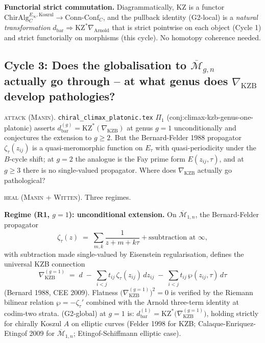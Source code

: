 \documentclass[12pt]{article}
\providecommand{\KZ}{\mathrm{KZ}}
\providecommand{\KZB}{\mathrm{KZB}}
\providecommand{\Arn}{\mathrm{Arnold}}
\providecommand{\Mbar}{\overline{\mathcal{M}}}
\providecommand{\dbar}{d_{\mathrm{bar}}}
\providecommand{\ChirAlg}{\mathrm{ChirAlg}}
\providecommand{\ConnConf}{\mathrm{Conn\text{-}Conf}}
\theoremstyle{definition}
\begin{document}
\textbf{Functorial strict commutation.}
Diagrammatically, $\KZ$ is a functor
$\ChirAlg^{E_\infty,\mathrm{Koszul}}_{C}
 \to \ConnConf_{C}$,
and the pullback identity (G2-local) is a \emph{natural
transformation} $\dbar \Rightarrow \KZ^{*}\nabla_{\Arn}$ that is
strict pointwise on each object (Cycle 1) and strict
functorially on morphisms (this cycle).  No homotopy
coherence needed.

\subsection{Cycle 3: Does the globalisation to $\Mbar_{g,n}$
actually go through -- at what genus does $\nabla_{\KZB}$
develop pathologies?}
\label{ssec:cycle-3}

\textsc{attack (Manin).}
\texttt{chiral\_climax\_platonic.tex} $\Pi_1$
(conj:climax-kzb-genus-one-platonic) asserts
$\dbar^{(g)} = \KZ^{*}(\nabla_{\KZB})$ at genus $g = 1$
unconditionally and conjectures the extension to $g \geq 2$.
But the Bernard-Felder 1988 propagator
$\zeta_\tau(z_{ij})$ is a quasi-meromorphic function on
$E_\tau$ with quasi-periodicity under the $B$-cycle shift;
at $g = 2$ the analogue is the Fay prime form
$E(z_{ij}, \tau)$, and at $g \geq 3$ there is no
single-valued propagator.  Where does $\nabla_{\KZB}$
actually go pathological?

\textsc{heal (Manin + Witten).}
Three regimes.

\textbf{Regime (R1, $g = 1$): unconditional extension.}
On $\Mbar_{1,n}$, the Bernard-Felder propagator
\[
   \zeta_\tau(z) \;=\; \sum_{m,k}\frac{1}{z + m + k\tau} + \text{ssubtraction at }\infty,
\]
with subtraction made single-valued by Eisenstein regularisation,
defines the universal KZB connection
\[
   \nabla_{\KZB}^{(g=1)}
   \;=\; d \;-\; \sum_{i < j}t_{ij}\,\zeta_\tau(z_{ij})\,dz_{ij}
              \;-\; \sum_{i < j}t_{ij}\,\wp(z_{ij}, \tau)\,d\tau
\]
(Bernard 1988, CEE 2009).
Flatness $\bigl(\nabla_{\KZB}^{(g=1)}\bigr)^{2} = 0$ is verified
by the Riemann bilinear relation
$\wp = -\zeta_\tau'$ combined with the Arnold three-term identity
at codim-two strata.  (G2-global) at $g = 1$ is:
$\dbar^{(1)} = \KZ^{*}\bigl(\nabla_{\KZB}^{(g=1)}\bigr)$,
holding strictly for chirally Koszul $A$ on elliptic curves
(Felder 1998 for KZB; Calaque-Enriquez-Etingof 2009 for
$\Mbar_{1,n}$; Etingof-Schiffmann elliptic case).
\end{document}
